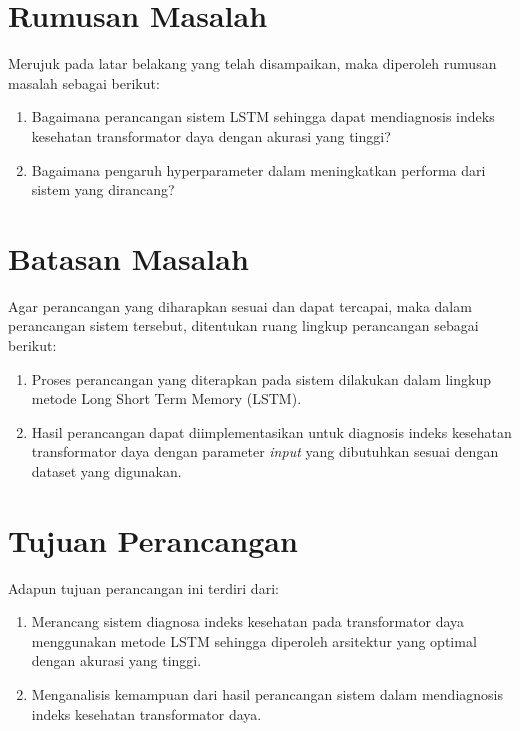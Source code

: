 \section{Rumusan Masalah}
Merujuk pada latar belakang yang telah disampaikan, maka diperoleh rumusan masalah sebagai berikut:
\begin{enumerate}
	\item Bagaimana perancangan sistem LSTM sehingga dapat mendiagnosis indeks kesehatan transformator daya dengan akurasi yang tinggi?
	\item Bagaimana pengaruh hyperparameter dalam meningkatkan performa dari sistem yang dirancang?
\end{enumerate}


\section{Batasan Masalah}
Agar perancangan yang diharapkan sesuai dan dapat tercapai, maka dalam perancangan sistem tersebut, ditentukan ruang lingkup perancangan sebagai berikut:
\begin{enumerate}
	\item Proses perancangan yang diterapkan pada sistem dilakukan dalam lingkup metode Long Short Term Memory (LSTM).
	\item Hasil perancangan dapat diimplementasikan untuk diagnosis indeks kesehatan transformator daya dengan parameter \textit{input} yang dibutuhkan sesuai dengan dataset yang digunakan.
\end{enumerate}

\section{Tujuan Perancangan}
Adapun tujuan perancangan ini terdiri dari:
\begin{enumerate}
	\item Merancang sistem diagnosa indeks kesehatan pada transformator daya menggunakan metode LSTM sehingga diperoleh arsitektur yang optimal dengan akurasi yang tinggi.
	\item Menganalisis kemampuan dari hasil perancangan sistem dalam mendiagnosis indeks kesehatan transformator daya.
\end{enumerate}


